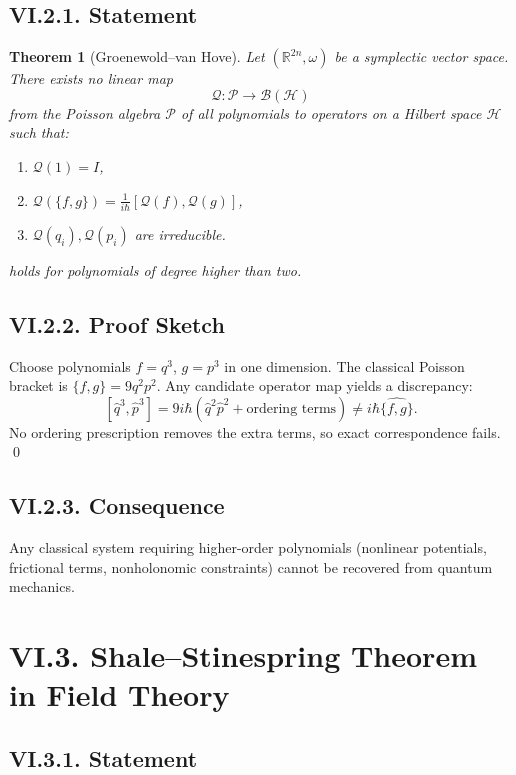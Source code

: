 \documentclass[12pt,oneside]{book}
\theoremstyle{plain}
\newtheorem{theorem}{Theorem}[chapter]
\theoremstyle{definition}
\begin{document}
\subsection*{VI.2.1. Statement}

\begin{theorem}[Groenewold–van Hove]
Let $(\mathbb{R}^{2n},\omega)$ be a symplectic vector space. There exists no linear map
\[
\mathcal{Q}:\mathcal{P} \to \mathcal{B}(\mathcal{H})
\]
from the Poisson algebra $\mathcal{P}$ of all polynomials to operators on a Hilbert space $\mathcal{H}$ such that:

\begin{enumerate}
    \item $\mathcal{Q}(1) = I$,
    \item $\mathcal{Q}(\{f,g\}) = \frac{1}{i\hbar}[\mathcal{Q}(f),\mathcal{Q}(g)]$,
    \item $\mathcal{Q}(q_i),\mathcal{Q}(p_i)$ are irreducible.
\end{enumerate}

holds for polynomials of degree higher than two.
\end{theorem}

\subsection*{VI.2.2. Proof Sketch}

Choose polynomials $f = q^3$, $g = p^3$ in one dimension. The classical Poisson bracket is $\{f,g\} = 9 q^2 p^2$. Any candidate operator map yields a discrepancy:
\[
[\widehat{q}^3, \widehat{p}^3] = 9 i \hbar (\widehat{q}^2 \widehat{p}^2 + \text{ordering terms}) \neq i\hbar \widehat{\{f,g\}}.
\]
No ordering prescription removes the extra terms, so exact correspondence fails. \qed

\subsection*{VI.2.3. Consequence}

Any classical system requiring higher-order polynomials (nonlinear potentials, frictional terms, nonholonomic constraints) cannot be recovered from quantum mechanics.

\section{VI.3. Shale–Stinespring Theorem in Field Theory}

\subsection*{VI.3.1. Statement}
\end{document}
